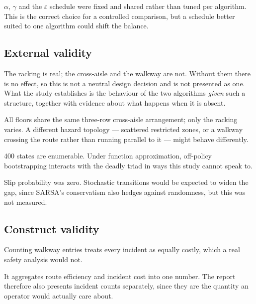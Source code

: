  $\alpha$, $\gamma$ and the $\varepsilon$ schedule were fixed and
shared rather than tuned per algorithm. This is the correct choice for a controlled comparison, but
a schedule better suited to one algorithm could shift the balance.

\subsection{External validity}

 The racking is real; the cross-aisle and the walkway are
not. Without them there is no effect, so this is not a neutral design decision and is not presented
as one. What the study establishes is the behaviour of the two algorithms \emph{given} such a
structure, together with evidence about what happens when it is absent.

 All floors share the same three-row cross-aisle arrangement; only
the racking varies. A different hazard topology --- scattered restricted zones, or a walkway
crossing the route rather than running parallel to it --- might behave differently.

 400 states are enumerable. Under function approximation, off-policy
bootstrapping interacts with the deadly triad \cite{sutton2018} in ways this study cannot speak to.

 Slip probability was zero. Stochastic transitions would be
expected to widen the gap, since SARSA's conservatism also hedges against randomness, but this was
not measured.

\subsection{Construct validity}

 Counting walkway entries treats every incident as equally
costly, which a real safety analysis would not.

 It aggregates route efficiency and incident cost into
one number. The report therefore also presents incident counts separately, since they are the
quantity an operator would actually care about.
